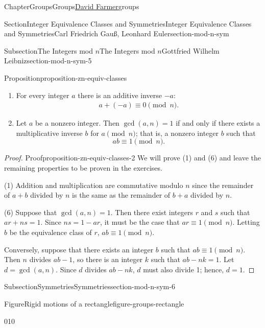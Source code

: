 \documentclass[oneside,10pt,]{book}
\numberwithin{equation}{section}
\begin{document}
\begin{chapterptx}{Chapter}{Groups}{}{Groups}{\hyperlink{dfarmer}{David Farmer}}{}{groups}
\begin{sectionptx}{Section}{Integer Equivalence Classes and Symmetries}{}{Integer Equivalence Classes and Symmetries}{Carl Friedrich Gauß, Leonhard Euler}{}{section-mod-n-sym}
\begin{subsectionptx}{Subsection}{The Integers mod \(n\)}{}{The Integers mod \(n\)}{Gottfried Wilhelm Leibniz}{}{section-mod-n-sym-5}
\begin{proposition}{Proposition}{}{}{proposition-zn-equiv-classes}
\begin{enumerate}
\begin{gather*}
a  (b  + c)  \equiv a  b + a  c  \pmod{ n}\text{.}
\end{gather*}
%
\item{}For every integer \(a\) there is an additive inverse \(-a\):%
\begin{gather*}
a + (-a)  \equiv 0 \pmod{ n}\text{.}
\end{gather*}
%
\item{}Let \(a\) be a nonzero integer.  Then \(\gcd(a,n) = 1\) if and only if there exists a multiplicative inverse \(b\) for \(a \pmod{n}\); that is, a nonzero integer \(b\) such that%
\begin{equation*}
a  b  \equiv 1 \pmod{ n}\text{.}
\end{equation*}
%
\end{enumerate}
%
\end{proposition}
\begin{proof}{Proof}{}{proposition-zn-equiv-classes-2}
We will prove (1) and (6) and leave the remaining properties to be proven in the exercises.%
\par
(1) Addition and multiplication are commutative modulo \(n\) since the remainder of \(a + b\) divided by \(n\) is the same as the remainder of \(b + a\) divided by \(n\).%
\par
(6) Suppose that \(\gcd(a, n) = 1\).  Then there exist integers \(r\) and \(s\) such that \(ar + ns = 1\).  Since \(ns = 1 - ar\), it must be the case that \(ar \equiv 1 \pmod{n}\).  Letting \(b\) be the equivalence class of \(r\), \(a b \equiv 1\pmod{n}\).%
\par
Conversely, suppose that there exists an integer \(b\) such that \(ab  \equiv 1 \pmod{ n}\).  Then \(n\) divides \(ab -1\), so there is an integer \(k\) such that \(ab - nk = 1\).  Let \(d = \gcd(a,n)\).  Since \(d\) divides \(ab - nk\), \(d\) must also divide 1; hence, \(d = 1\).%
\end{proof}
\end{subsectionptx}
%
%
\typeout{************************************************}
\typeout{************************************************}
%
\begin{subsectionptx}{Subsection}{Symmetries}{}{Symmetries}{}{}{section-mod-n-sym-6}
\begin{figureptx}{Figure}{Rigid motions of a rectangle}{figure-groups-rectangle}{}%
\begin{image}{0}{1}{0}{}%
\end{image}
\end{figureptx}
\end{subsectionptx}
\end{sectionptx}
\end{chapterptx}
\end{document}
